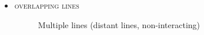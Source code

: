 \documentclass[../main/main.tex]{subfiles}
\begin{document}
\begin{itemize}
\item \textsc{overlapping lines}
	\begin{figure}[H]
	\centering
	\hspace*{-0.5in}
	\begin{subfigure}{.6\textwidth}

	\end{subfigure}%
	\begin{subfigure}{.6\textwidth}

	\end{subfigure}
	\caption{Multiple lines (distant lines, non-interacting)}
	\label{multiple_lines_1}
	\end{figure}
\end{itemize}

\end{document}
